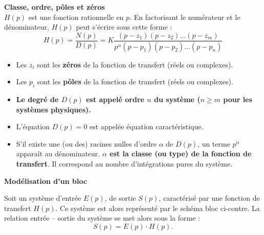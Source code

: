 \begin{defi} \textbf{\textsf{Classe, ordre, pôles et zéros}} ~\\
$H(p)$ est une fonction rationnelle en $p$. En factorisant le numérateur et le
dénominateur, $H(p)$ peut s'écrire sous cette forme :
$$
H(p) = \dfrac{N(p)}{D(p)} =
K \dfrac{\left(p-z_1 \right)\left(p-z_2 \right)...\left(p-z_m \right)}{
p^{\alpha} \left(p-p_1 \right)\left(p-p_2 \right)...\left(p-p_n \right)}
$$


 \begin{itemize}
 \item Les $z_i$ sont les \textbf{zéros} de la fonction de transfert (réels ou
complexes).
\item Les $p_i$ sont les \textbf{pôles} de la fonction de transfert (réels ou
complexes).
\item \textbf{Le degré de $D(p)$ est appelé ordre $n$ du système ($n\geq m$ pour les
systèmes physiques).}
\item L'équation $D(p)=0$ est appelée équation caractéristique.
\item S'il existe une (ou des) racines nulles d'ordre $\alpha$ de $D(p)$, un
terme $p^\alpha$ apparaît au dénominateur. \textbf{$\alpha$ est la classe (ou type) de
la fonction de transfert}. Il correspond au nombre d'intégrations pures du
système.
\end{itemize}


\end{defi}



\begin{defi} \textbf{\textsf{Modélisation d'un bloc}}~\\

\noindent \begin{minipage}[c]{.75\linewidth}
Soit un système d'entrée $E(p)$, de sortie $S(p)$, caractérisé par une fonction
de transfert $H(p)$. Ce système est alors représenté par le schéma bloc ci-contre.
La relation entrée -- sortie du système se met alors sous la forme : 
$$
S(p) = E(p) \cdot H(p).
$$
\end{minipage} \hfill
\begin{minipage}[c]{.2\linewidth}
\begin{center}
\end{center}
\end{minipage}

\end{defi}

